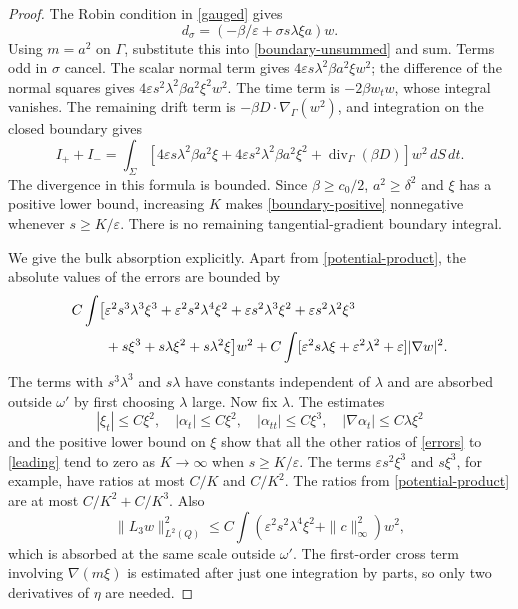 \documentclass[11pt]{article}
\theoremstyle{remark}
\newcommand{\eps}{\varepsilon}
\newcommand{\divg}{\operatorname{div}}
\newcommand{\ds}{\,dS\,dt}
\begin{document}
\begin{proof}
The Robin condition in \eqref{gauged} gives
\begin{equation}\label{normal-weighted}
 d_\sigma=(-\beta/\eps+\sigma s\lambda\xi a)w.
\end{equation}
Using $m=a^2$ on $\Gamma$, substitute this into
\eqref{boundary-unsummed} and sum. Terms odd in $\sigma$ cancel. The scalar
normal term gives $4\eps s\lambda^2\beta a^2\xi w^2$; the difference of
the normal squares gives $4\eps s^2\lambda^2\beta a^2\xi^2w^2$.
The time term is $-2\beta w_tw$, whose integral vanishes.
The remaining drift term is $-\beta D\cdot\nabla_\Gamma(w^2)$, and
integration on the closed boundary gives
\begin{equation}\label{boundary-positive}
 I_++I_-=
 \int_\Sigma\left[4\eps s\lambda^2\beta a^2\xi
       +4\eps s^2\lambda^2\beta a^2\xi^2
       +\divg_\Gamma(\beta D)\right]w^2\ds.
\end{equation}
The divergence in this formula is bounded. Since $\beta\ge c_0/2$,
$a^2\ge\delta^2$ and $\xi$ has a positive lower bound, increasing $K$
makes \eqref{boundary-positive} nonnegative whenever $s\ge K/\eps$.
There is no remaining tangential-gradient boundary integral.

We give the bulk absorption explicitly. Apart from
\eqref{potential-product}, the absolute values of the errors are bounded by
\begin{align}
 C\int\bigl[&\eps^2s^3\lambda^3\xi^3+
 \eps^2s^2\lambda^4\xi^2+
 \eps s^2\lambda^3\xi^2+
 \eps s^2\lambda^2\xi^3\notag\\
 &+s\xi^3+s\lambda\xi^2+s\lambda^2\xi\bigr]w^2
 +C\int[\eps^2s\lambda\xi+\eps^2\lambda^2+\eps]|\nabla w|^2.
 \label{errors}
\end{align}
The terms with $s^3\lambda^3$ and $s\lambda$ have constants independent of
$\lambda$ and are absorbed outside $\omega'$ by first choosing $\lambda$
large. Now fix $\lambda$. The estimates
\[
 |\xi_t|\le C\xi^2,\quad |\alpha_t|\le C\xi^2,
 \quad |\alpha_{tt}|\le C\xi^3,\quad
 |\nabla\alpha_t|\le C\lambda\xi^2
\]
and the positive lower bound on $\xi$ show that all the other ratios of
\eqref{errors} to \eqref{leading} tend to zero as $K\to\infty$ when
$s\ge K/\eps$. The terms $\eps s^2\xi^3$ and $s\xi^3$, for example, have
ratios at most $C/K$ and $C/K^2$. The ratios from
\eqref{potential-product} are at most $C/K^2+C/K^3$. Also
\[
 \|L_3w\|_{L^2(Q)}^2
 \le C\int(\eps^2s^2\lambda^4\xi^2+\|c\|_\infty^2)w^2,
\]
which is absorbed at the same scale outside $\omega'$. The first-order
cross term involving $\nabla(m\xi)$ is estimated after just one integration
by parts, so only two derivatives of $\eta$ are needed.


\end{proof}
\end{document}

